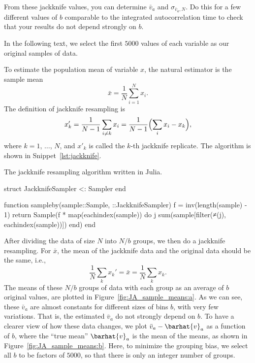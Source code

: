From these jackknife values, you can determine \(\bar{v}_a\) and \(\sigma_{\bar{v}_a,N}\).
Do this for a few different values of \(b\) comparable to the integrated autocorrelation
time to check that your results do not depend strongly on \(b\).

\Answer{}
In the following text, we select the first \(5000\) values of each variable as our original
samples of data.

To estimate the population mean of variable \(x\),
the natural estimator is the sample mean
%
\begin{equation}
    \bar{x} = \frac{ 1 }{ N } \sum_{i=1}^N x_i.
\end{equation}
%
The definition of jackknife resampling is
%
\begin{equation}
    x_k' = \frac{1}{N - 1}
    \sum_{i \neq k} x_i = \frac{ 1 }{ N - 1 } \Bigl(\sum_i x_i - x_k \Bigr),
\end{equation}
%
where \(k = 1\), \(\ldots\), \(N\), and \(x'_k\) is called the \(k\)-th jackknife replicate.
The algorithm is shown in Snippet~\ref{lst:jackknife}.
%
\begin{algorithm}
    \caption{The jackknife resampling algorithm written in Julia.}
    \label{lst:jackknife}
    \begin{juliacode}
        struct JackknifeSampler <: Sampler end

        function sampleby(sample::Sample, ::JackknifeSampler)
            f = inv(length(sample) - 1)
            return Sample(f * map(eachindex(sample)) do j
                sum(sample[filter(≠(j), eachindex(sample))])
            end)
        end
    \end{juliacode}
\end{algorithm}

After dividing the data of size \(N\) into \(N/b\) groups, we then do a jackknife resampling.
For \(\bar{x}\), the mean of the jackknife data and the original data should be the
same, i.e.,
%
\begin{equation}
    \frac{ 1 }{ N } \sum_k x_k' = \bar{x} = \frac{ 1 }{ N } \sum_k x_k.
\end{equation}
%
The means of these \(N/b\) groups of data with each group as an average of \(b\) original
values, are plotted in Figure~\ref{fig:JA_sample_means:a}.
As we can see, these \(\bar{v}_a\) are almost constants for different sizes of bins \(b\),
with very few variations.
That is, the estimated \(\bar{v}_a\) do not strongly depend on \(b\).
To have a clearer view of how these data changes, we plot \(\bar{v}_a - \barhat{v}_a\)
as a function of \(b\), where the ``true mean'' \(\barhat{v}_a\) is the mean of
the means, as shown in Figure~\ref{fig:JA_sample_means:b}.
Here, to minimize the grouping bias, we select all \(b\) to be factors of \(5000\),
so that there is only an integer number of groups.

